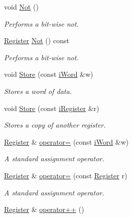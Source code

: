 \begin{DoxyCompactItemize}
void \hyperlink{classRegister_abbf5f6793328db8b28845cac84c0e82d}{Not} ()
\begin{DoxyCompactList}\small\item\em Performs a bit-\/wise not. \item\end{DoxyCompactList}\item 
\hyperlink{classRegister}{Register} \hyperlink{classRegister_a387bb50d01b47071c366708ea10ebdf0}{Not} () const 
\begin{DoxyCompactList}\small\item\em Performs a bit-\/wise not. \item\end{DoxyCompactList}\item 
void \hyperlink{classRegister_affcc16cc88cdc896803b1ab6af5d38e0}{Store} (const \hyperlink{classiWord}{iWord} \&w)
\begin{DoxyCompactList}\small\item\em Stores a word of data. \item\end{DoxyCompactList}\item 
void \hyperlink{classRegister_a2ac7bd6f2e0eb38800c0a8c8d045e18e}{Store} (const \hyperlink{classiRegister}{iRegister} \&r)
\begin{DoxyCompactList}\small\item\em Stores a copy of another register. \item\end{DoxyCompactList}\item 
\hyperlink{classRegister}{Register} \& \hyperlink{classRegister_afc5f775405700146638e392d81ad7d0b}{operator=} (const \hyperlink{classiWord}{iWord} \&w)
\begin{DoxyCompactList}\small\item\em A standard assignment operator. \item\end{DoxyCompactList}\item 
\hyperlink{classRegister}{Register} \& \hyperlink{classRegister_a00f7aaf798102e5c7a6fb311551b492f}{operator=} (const \hyperlink{classRegister}{Register} r)
\begin{DoxyCompactList}\small\item\em A standard assignment operator. \item\end{DoxyCompactList}\item 
\hyperlink{classRegister}{Register} \& \hyperlink{classRegister_ac4e78cff131bc5c69695a9db5ca35255}{operator++} ()

\end{DoxyCompactItemize}
